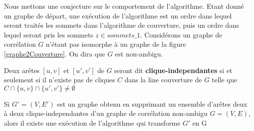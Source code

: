 Nous mettons une conjecture sur le comportement de l'algorithme.
Etant donn\'e un graphe de d\'epart, une ex\'ecution de l'algorithme est un ordre dans lequel seront trait\'es les sommets dans l'algorithme de couverture, puis un ordre dans lequel seront pris les sommets $z \in sommets\_1$.
\newline
Consid\'erons un graphe de corr\'elation $G$ n'\'etant pas isomorphe \`a un graphe de la figure \ref{graphe2Couverture}. On dira que $G$ est non-ambigu.

Deux ar\^etes $[u,v]$ et $[u',v']$ de $G$ seront dit {\bf clique-independantes} si et seulement si il n'existe pas de cliques $C$ dans la line couverture  de $G$ telle que 
$C \cap \{u,v\} \cap \{u',v'\} \ne \emptyset$

\begin{conjecture}
Si $G'=(V, E')$ est un graphe obtenu en supprimant un ensemble d'ar\^etes deux \`a deux clique-independantes d'un graphe de corr\'elation non-ambigu $G=(V,E)$, alors il existe une ex\'ecution de l'algorithme qui transforme $G'$ en G
\end{conjecture}

%